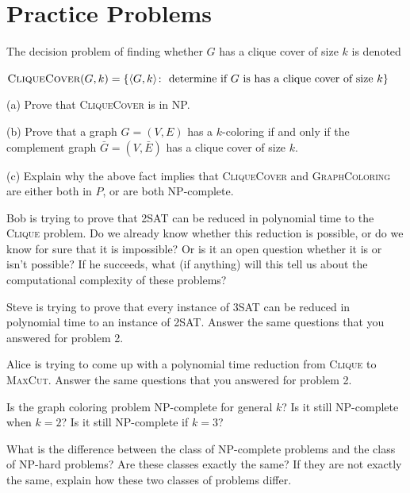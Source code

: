 \documentclass[11  pt]{exam}
\begin{document}
	\section{Practice Problems}
	
	\begin{questions}
		
		\question 
		The decision problem of finding whether $G$ has a clique cover of size $k$ is denoted
		\begin{center}
			$\textsc{CliqueCover}(G,k) = \{ \langle G, k \rangle \colon \text{ determine if $G$ is has a clique cover of size $k$}\}$
		\end{center}
		
		
		(a) Prove that \textsc{CliqueCover} is in NP.
		
		(b) Prove that a graph $G = (V,E)$ has a $k$-coloring if and only if the complement graph $\bar{G} = (V, \bar{E})$ has a clique cover of size $k$.
		
		(c) Explain why the above fact implies that \textsc{CliqueCover} and \textsc{GraphColoring} are either both in $P$, or are both NP-complete.
		

	\question Bob is trying to prove that 2SAT can be reduced in polynomial time to the \textsc{Clique} problem. Do we already know whether this reduction is possible, or do we know for sure that it is impossible? Or is it an open question whether it is or isn't possible?  If he succeeds, what (if anything) will this tell us about the computational complexity of these problems? 
	
	\question Steve is trying to prove that every instance of 3SAT can be reduced in polynomial time to an instance of 2SAT.  Answer the same questions that you answered for problem 2.
	
	\question Alice is trying to come up with a polynomial time reduction from \textsc{Clique} to \textsc{MaxCut}. Answer the same questions that you answered for problem 2.
	
	\question Is the graph coloring problem NP-complete for general $k$? Is it still NP-complete when $k = 2$? Is it still NP-complete if $k = 3$?
	
	\question What is the difference between the class of NP-complete problems and the class of NP-hard problems? Are these classes exactly the same? If they are not exactly the same, explain how these two classes of problems differ.
	

\end{questions}
\end{document}
